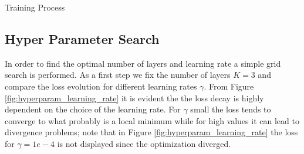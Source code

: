 \begin{algorithm}[h]
    \Data{$\underline{\mG}$,$\underline{\vb}$,$\underline{\vf}$}
    \BlankLine
 \label{training}
 \caption{Training Process}
\end{algorithm}

\subsection{Hyper Parameter Search}
In order to find the optimal number of layers and learning rate a simple grid search is performed.
As a first step we fix the number of layers $K=3$ and compare the loss evolution for different learning rates $\gamma$.
From Figure \ref{fig:hyperparam_learning_rate} it is evident the the loss decay is highly dependent on the choice of the learning rate. For $\gamma$ small the loss tends to converge to what probably is a local minimum while for high values it can lead to divergence problems; note that in Figure \ref{fig:hyperparam_learning_rate} the loss for $\gamma=1e-4$ is not displayed since the optimization diverged. 



